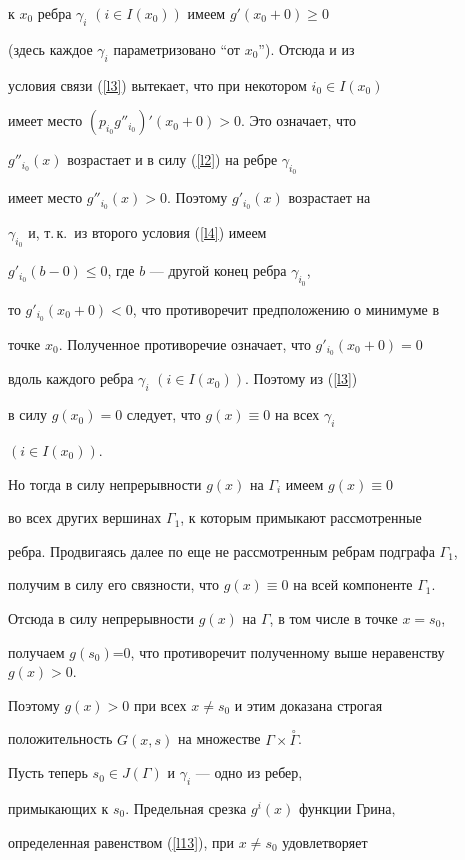 {{{{{{{к $x_0$ ребра $\gamma_i$ $(i \in I(x_0))$ имеем $g'(x_0+0)\geq 0$


(здесь каждое $\gamma_i$ параметризовано ``от $x_0$''). Отсюда и из


условия связи (\ref{l3}) вытекает, что при некотором $i_0 \in I(x_0)$


имеет место $(p_{i_0}g''_{i_0})'(x_0+0)>0$. Это означает, что


$g''_{i_0}(x)$ возрастает и в силу (\ref{l2}) на ребре $\gamma_{i_0}$


имеет место $g''_{i_0}(x)>0$. Поэтому $g'_{i_0}(x)$ возрастает на


$\gamma_{i_0}$ и, т.\,к.~из второго условия (\ref{l4}) имеем


$g'_{i_0}(b-0)\leq 0$, где $b$ --- другой конец ребра $\gamma_{i_0}$,


то $g'_{i_0}(x_0+0)<0$, что противоречит предположению о минимуме в


точке $x_0$. Полученное противоречие означает, что $g'_{i_0}(x_0+0)=0$


вдоль каждого ребра $\gamma_i$ $(i \in I(x_0))$. Поэтому из (\ref{l3})


в силу $g(x_0)=0$ следует, что $g(x)\equiv 0$ на всех $\gamma_i$


$(i\in I(x_0))$.


Но тогда в силу непрерывности $g(x)$ на $\Gamma_i$ имеем $g(x)\equiv 0$


во всех других вершинах $\Gamma_1$, к которым примыкают рассмотренные


ребра. Продвигаясь далее по еще не рассмотренным ребрам подграфа $\Gamma_1$,


получим в силу его связности, что $g(x)\equiv 0$ на всей компоненте $\Gamma_1$.


Отсюда в силу непрерывности $g(x)$ на $\Gamma$, в том числе в точке $x=s_0$,


получаем $g(s_0)$=0, что противоречит полученному выше неравенству $g(x)>0$.


Поэтому $g(x)>0$ при всех $x \ne s_0$ и этим доказана строгая


положительность $G(x,s)$ на множестве $\Gamma\times\overset{\circ}{\Gamma}$.





Пусть теперь $s_0 \in J(\Gamma)$ и $\gamma_i$ --- одно из ребер,


примыкающих к $s_0$. Предельная срезка $g^i(x)$ функции Грина,


определенная равенством (\ref{l13}), при $x \ne s_0$ удовлетворяет


}}}}}}}
